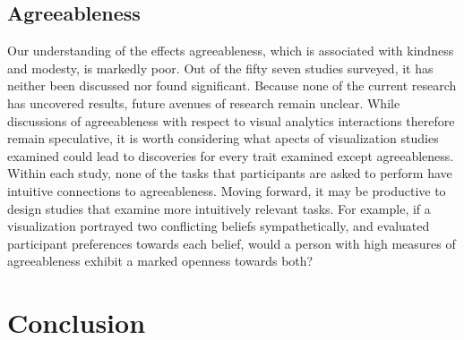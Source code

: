 \documentclass[conference]{IEEEtran}
\begin{document}
\subsection{Agreeableness}\label{Agreeableness}
Our understanding of the effects agreeableness, which is associated with kindness and modesty,
is markedly poor. Out of the fifty seven studies surveyed, it has neither been discussed nor
found significant. Because none of the current research has uncovered results, future
avenues of research remain unclear. While discussions of agreeableness with respect to
visual analytics interactions therefore remain speculative, it is worth considering what
apects of visualization studies examined could lead to discoveries for every trait examined
except agreeableness. Within each study, none of the tasks that participants are asked to
perform have intuitive connections to agreeableness. Moving forward, it may be productive to
design studies that examine more intuitively relevant tasks. For example, if a visualization
portrayed two conflicting beliefs sympathetically, and evaluated participant preferences
towards each belief, would a person with high measures of agreeableness exhibit a marked
openness towards both?

\section{Conclusion}


\vspace{12pt}
\end{document}
